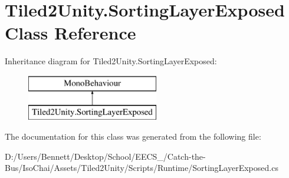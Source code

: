 \hypertarget{class_tiled2_unity_1_1_sorting_layer_exposed}{}\section{Tiled2\+Unity.\+Sorting\+Layer\+Exposed Class Reference}
\label{class_tiled2_unity_1_1_sorting_layer_exposed}
Inheritance diagram for Tiled2\+Unity.\+Sorting\+Layer\+Exposed\+:\begin{figure}[H]
\begin{center}
\leavevmode
\includegraphics[height=2.000000cm]{class_tiled2_unity_1_1_sorting_layer_exposed}
\end{center}
\end{figure}


The documentation for this class was generated from the following file\+:\begin{DoxyCompactItemize}
\item 
D\+:/\+Users/\+Bennett/\+Desktop/\+School/\+E\+E\+C\+S\+\_/\+Catch-\/the-\/\+Bus/\+Iso\+Chai/\+Assets/\+Tiled2\+Unity/\+Scripts/\+Runtime/Sorting\+Layer\+Exposed.\+cs\end{DoxyCompactItemize}
